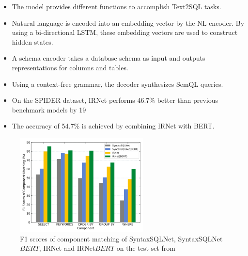 \begin{itemize}
    \item The model provides different functions to accomplish Text2SQL tasks.
    \item Natural language is encoded into an embedding vector by the NL encoder. By using a bi-directional LSTM, these embedding vectors are used to construct hidden states.
    \item A schema encoder takes a database schema as input and outputs representations for columns and tables.
    \item Using a context-free grammar, the decoder synthesizes SemQL queries.
    \item On the SPIDER dataset, IRNet performs 46.7\% better than previous benchmark models by 19%
    \item The accuracy of 54.7\% is achieved by combining IRNet with BERT.
\end{itemize}

\begin{figure}[htb]
    \centering
    \includegraphics[width=0.6\textwidth]{pics/IRNet/f1}
    \caption{F1 scores of component matching of SyntaxSQLNet, SyntaxSQLNet\(BERT\), IRNet and IRNet\(BERT\) on the test set from \cite{DBLP:journals/corr/abs-1905-08205}}
    \label{fig:f1}
\end{figure}
